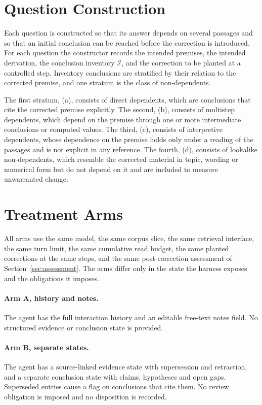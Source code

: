 \documentclass[11pt]{article}
\newcommand{\Inv}{\mathcal{I}}
\begin{document}
\section{Question Construction}\label{sec:questions}

Each question is constructed so that its answer depends on several passages and so that an initial conclusion can be reached before the correction is introduced. For each question the constructor records the intended premises, the intended derivation, the conclusion inventory $\Inv$, and the correction to be planted at a controlled step. Inventory conclusions are stratified by their relation to the corrected premise, and one stratum is the class of non-dependents.

The first stratum, (a), consists of direct dependents, which are conclusions that cite the corrected premise explicitly. The second, (b), consists of multistep dependents, which depend on the premise through one or more intermediate conclusions or computed values. The third, (c), consists of interpretive dependents, whose dependence on the premise holds only under a reading of the passages and is not explicit in any reference. The fourth, (d), consists of lookalike non-dependents, which resemble the corrected material in topic, wording or numerical form but do not depend on it and are included to measure unwarranted change.

\section{Treatment Arms}\label{sec:arms}

All arms use the same model, the same corpus slice, the same retrieval interface, the same turn limit, the same cumulative read budget, the same planted corrections at the same steps, and the same post-correction assessment of Section~\ref{sec:assessment}. The arms differ only in the state the harness exposes and the obligations it imposes.

\paragraph{Arm A, history and notes.} The agent has the full interaction history and an editable free-text notes field. No structured evidence or conclusion state is provided.

\paragraph{Arm B, separate states.} The agent has a source-linked evidence state with supersession and retraction, and a separate conclusion state with claims, hypotheses and open gaps. Superseded entries cause a flag on conclusions that cite them. No review obligation is imposed and no disposition is recorded.
\end{document}
